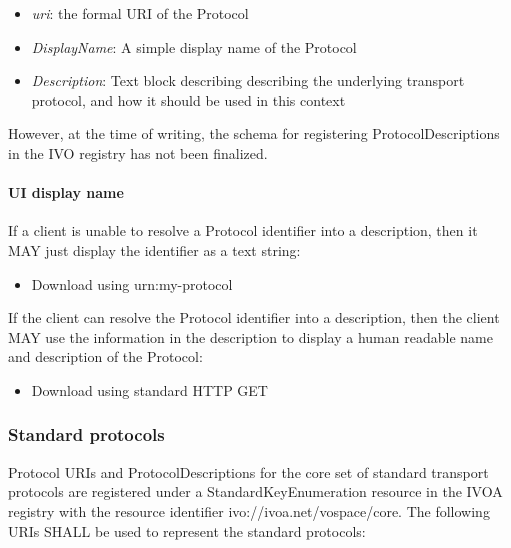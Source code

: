\documentclass[11pt,a4paper]{ivoa}
\begin{document}
\begin{itemize}
    \item \emph{uri}: the formal URI of the Protocol
    \item \emph{DisplayName}: A simple display name of the Protocol
    \item \emph{Description}: Text block describing describing the underlying transport protocol, and how it should be used in this context
\end{itemize}

However, at the time of writing, the schema for registering ProtocolDescriptions in the IVO registry has not been finalized.

\paragraph{UI display name}

If a client is unable to resolve a Protocol identifier into a description, then it MAY just display the identifier as a text string:

\begin{itemize}
    \item Download using urn:my-protocol
\end{itemize}

If the client can resolve the Protocol identifier into a description, then the client MAY use the information in the description to display a human readable name and description of the Protocol:

\begin{itemize}
    \item Download using standard HTTP GET
\end{itemize}

\subsubsection{Standard protocols}
\label{subsubsec:standard protocols}
Protocol URIs and ProtocolDescriptions for the core set of standard transport protocols are registered under a StandardKeyEnumeration resource \citep{std:STDREGEXT} in the IVOA registry with the resource identifier ivo://ivoa.net/vospace/core. The following URIs SHALL be used to represent the standard protocols:
\end{document}
